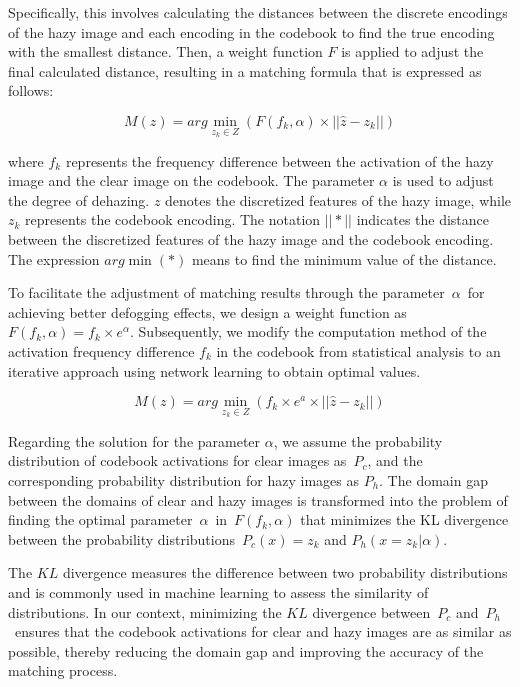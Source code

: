 \documentclass[journal]{IEEEtran}
\begin{document}
Specifically, this involves calculating the distances between the discrete encodings of the hazy image and each encoding in the codebook to find the true encoding with the smallest distance. Then, a weight function $F$ is applied to adjust the final calculated distance, resulting in a matching formula that is expressed as follows:

\begin{equation}
	\label{codebook_matching_equation_2}
	M(z) = arg \min_{z_{k} \in Z} (F(f_{k}, \alpha) \times || \widehat{z} - z_{k} ||)
\end{equation}

\noindent where $f_{k}$ represents the frequency difference between the activation of the hazy image and the clear image on the codebook. The parameter $ \alpha $ is used to adjust the degree of dehazing. $z$ denotes the discretized features of the hazy image, while $z_{k}$ represents the codebook encoding. The notation $||*||$ indicates the distance between the discretized features of the hazy image and the codebook encoding. The expression $arg \min(*)$ means to find the minimum value of the distance.


To facilitate the adjustment of matching results through the parameter $\alpha$ for achieving better defogging effects, we design a weight function as $F(f_{k}, \alpha) = f_{k} \times e^{\alpha} $. Subsequently, we modify the computation method of the activation frequency difference $f_{k}$ in the codebook from statistical analysis to an iterative approach using network learning to obtain optimal values.

\begin{equation}
	\label{codebook_matching_equation_1}
	M(z) = arg \min_{z_{k} \in Z} (f_{k} \times e^{a} \times || \widehat{z} - z_{k} ||)
\end{equation}

Regarding the solution for the parameter $\alpha$, we assume the probability distribution of codebook activations for clear images as $P_{c}$, and the corresponding probability distribution for hazy images as $P_{h}$. The domain gap between the domains of clear and hazy images is transformed into the problem of finding the optimal parameter $\alpha$ in $F(f_{k}, \alpha)$ that minimizes the KL divergence between the probability distributions $P_{c}(x) = z_{k}$ and $P_{h}(x = z_{k} | \alpha) $.


The $KL$ divergence measures the difference between two probability distributions and is commonly used in machine learning to assess the similarity of distributions. In our context, minimizing the $KL$ divergence between $P_{c}$ and $P_{h}$ ensures that the codebook activations for clear and hazy images are as similar as possible, thereby reducing the domain gap and improving the accuracy of the matching process.
\end{document}
